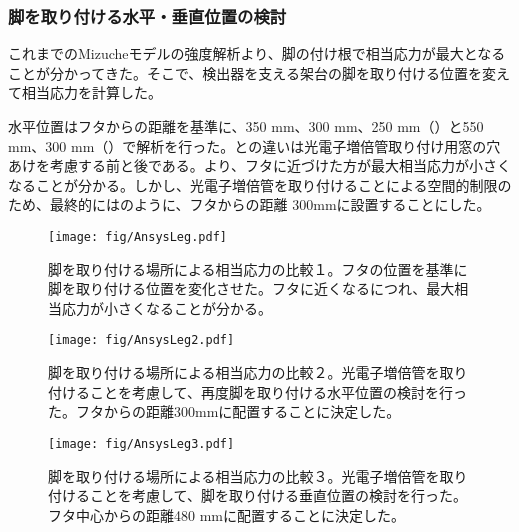 \subsubsection{脚を取り付ける水平・垂直位置の検討}
これまでのMizucheモデルの強度解析より、脚の付け根で相当応力が最大となることが分かってきた。そこで、検出器を支える架台の脚を取り付ける位置を変えて相当応力を計算した。

水平位置はフタからの距離を基準に、350 mm、300 mm、250 mm（）と550 mm、300 mm（）で解析を行った。との違いは光電子増倍管取り付け用窓の穴あけを考慮する前と後である。より、フタに近づけた方が最大相当応力が小さくなることが分かる。しかし、光電子増倍管を取り付けることによる空間的制限のため、最終的にはのように、フタからの距離 300mmに設置することにした。


\begin{figure}[htbp]
\centering
\texttt{[image: fig/AnsysLeg.pdf]}
\caption[脚を取り付ける場所による相当応力の比較１]{脚を取り付ける場所による相当応力の比較１。フタの位置を基準に脚を取り付ける位置を変化させた。フタに近くなるにつれ、最大相当応力が小さくなることが分かる。}
\label{AnsysLeg1}
\end{figure}

\begin{figure}[htbp]
\begin{minipage}{0.47\textwidth}
\centering
\texttt{[image: fig/AnsysLeg2.pdf]}
\caption[脚を取り付ける場所による相当応力の比較２]{脚を取り付ける場所による相当応力の比較２。光電子増倍管を取り付けることを考慮して、再度脚を取り付ける水平位置の検討を行った。フタからの距離300mmに配置することに決定した。}
\label{AnsysLeg2}
\end{minipage}
\hfill
\begin{minipage}{0.47\textwidth}
\centering
\texttt{[image: fig/AnsysLeg3.pdf]}
\caption[脚を取り付ける場所による相当応力の比較３]{脚を取り付ける場所による相当応力の比較３。光電子増倍管を取り付けることを考慮して、脚を取り付ける垂直位置の検討を行った。フタ中心からの距離480 mmに配置することに決定した。}
\label{AnsysLeg3}
\end{minipage}
\end{figure}

